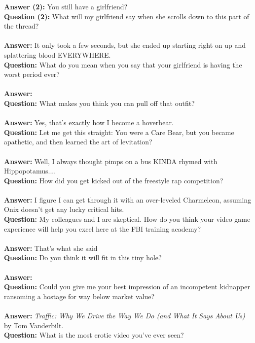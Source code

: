 \documentclass[a4paper]{article}
\begin{document}
\textbf{Answer (2):} You still have a girlfriend? \\
\textbf{Question (2):} What will my girlfriend say when she scrolls down to this part of the thread? \\ \\
\textbf{Answer:} It only took a few seconds, but she ended up starting right on up and splattering blood EVERYWHERE. \\
\textbf{Question:} What do you mean when you say that your girlfriend is having the worst period ever? \\ \\
\textbf{Answer:}  \\
\textbf{Question:} What makes you think you can pull off that outfit? \\ \\
\textbf{Answer:} Yes, that's exactly how I become a hoverbear. \\
\textbf{Question:} Let me get this straight: You were a Care Bear, but you became apathetic, and then learned the art of levitation? \\ \\
\textbf{Answer:} Well, I always thought pimps on a bus KINDA rhymed with Hippopotamus.... \\
\textbf{Question:} How did you get kicked out of the freestyle rap competition? \\ \\
\textbf{Answer:} I figure I can get through it with an over-leveled Charmeleon, assuming Onix doesn't get any lucky critical hits. \\
\textbf{Question:} My colleagues and I are skeptical. How do you think your video game experience will help you excel here at the FBI training academy? \\ \\
\textbf{Answer:} That's what she said \\
\textbf{Question:} Do you think it will fit in this tiny hole? \\ \\
\textbf{Answer:}  \\
\textbf{Question:} Could you give me your best impression of an incompetent kidnapper ransoming a hostage for way below market value? \\ \\
\textbf{Answer:} \textit{Traffic: Why We Drive the Way We Do (and What It Says About Us)} by Tom Vanderbilt. \\
\textbf{Question:} What is the most erotic video you've ever seen? \\ \\
\end{document}
